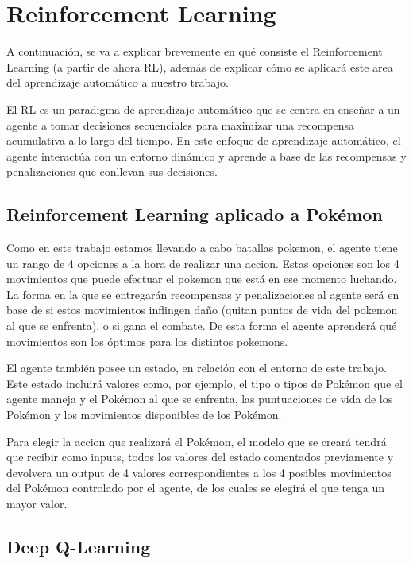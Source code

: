 \usepackage{amsmath}
\chapter{Reinforcement Learning}

A continuación, se va a explicar brevemente en qué consiste el Reinforcement Learning (a partir de ahora RL), además de explicar cómo se aplicará este area del aprendizaje automático a nuestro trabajo.

El RL es un paradigma de aprendizaje automático que se centra en enseñar a un agente a tomar decisiones secuenciales para maximizar una recompensa acumulativa a lo largo del tiempo. En este enfoque de aprendizaje automático, el agente interactúa con un entorno dinámico y aprende a base de las recompensas y penalizaciones que conllevan sus decisiones.

\section{Reinforcement Learning aplicado a Pokémon}

Como en este trabajo estamos llevando a cabo batallas pokemon, el agente tiene un rango de 4 opciones a la hora de realizar una accion. Estas opciones son los 4 movimientos que puede efectuar el pokemon que está en ese momento luchando. La forma en la que se entregarán recompensas y penalizaciones al agente será en base de si estos movimientos inflingen daño (quitan puntos de vida del pokemon al que se enfrenta), o si gana el combate. De esta forma el agente aprenderá qué movimientos son los óptimos para los distintos pokemons.

El agente también posee un estado, en relación con el entorno de este trabajo. Este estado incluirá valores como, por ejemplo, el tipo o tipos de Pokémon que el agente maneja y el Pokémon al que se enfrenta, las puntuaciones de vida de los Pokémon y los movimientos disponibles de los Pokémon.

Para elegir la accion que realizará el Pokémon, el modelo que se creará tendrá que recibir como inputs, todos los valores del estado comentados previamente y devolvera un output de 4 valores correspondientes a los 4 posibles movimientos del Pokémon controlado por el agente, de los cuales se elegirá el que tenga un mayor valor.

\section{Deep Q-Learning}

